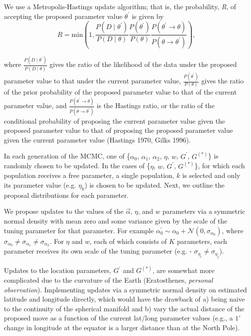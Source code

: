 \documentclass[12pt]{article}
\newcommand{\identifyadmixsource}[1]{{#1^{(*)}}}
\begin{document}
We use a Metropolis-Hastings update algorithm; that is, the probability, \emph{R}, of accepting the proposed parameter value $\theta^{\prime}$ is given by 
\begin{equation}
R = \text{min}\left(1, \frac{P(D \mid \theta^{\prime})} {P(D \mid \theta)} 
				\frac{P(\theta^{\prime})}{P(\theta)} 
				\frac{P(\theta^{\prime} \to \theta)}{P(\theta \to \theta^{\prime})}		\right) \text{,}
\label{eq:MH_algorithm}
\end{equation}

where $\frac{P(D \mid \theta^{\prime})} {P(D \mid \theta)}$ gives the ratio of the likelihood of the data under the proposed parameter value to that under the current parameter value, $\frac{P(\theta^{\prime})}{P(\theta)}$ gives the ratio of the prior probability of the proposed parameter value to that of the current parameter value, and $\frac{P(\theta^{\prime} \to \theta)}{P(\theta \to \theta^{\prime})}$ is the Hastings ratio, or the ratio of the conditional probability of proposing the current parameter value given the proposed parameter value to that of proposing the proposed parameter value given the current parameter value (Hastings 1970, Gilks 1996).

In each generation of the MCMC, one of \{$\alpha_0$, $\alpha_1$, $\alpha_2$, $\eta$, $w$, $G^{\prime}$, $\identifyadmixsource{G}$\} is randomly chosen to be updated.  In the cases of \{$\eta$, $w$, $G^{\prime}$, $\identifyadmixsource{G}$\}, for which each population receives a free parameter, a single population, $k$ is selected and only its parameter value (e.g. $\eta_k$) is chosen to be updated.  Next, we outline the proposal distributions for each parameter.

We propose updates to the values of the $\vec{\alpha}$, $\eta$, and $w$ parameters via a symmetric normal density with mean zero and some variance given by the scale of the tuning parameter for that parameter.  For example $\alpha_0^{\prime} \sim \alpha_0 + \mathcal{N}(0,\sigma_{\alpha_0})$, where $\sigma_{\alpha_0} \neq \sigma_{\alpha_1} \neq \sigma_{\alpha_2}$.  For $\eta$ and $w$, each of which consists of $K$ parameters, each parameter receives its own scale of the tuning parameter (e.g. - $\sigma_{\eta_{i}} \neq \sigma_{\eta_{j}}$).  

Updates to the location parameters, $G^{\prime}$ and $\identifyadmixsource{G}$, are somewhat more complicated due to the curvature of the Earth (Eratosthenes, \textit{personal observation}).  Implementing updates via a symmetric normal density on estimated latitude and longitude directly, which would have the drawback of a) being naive to the continuity of the spherical manifold and b) vary the actual distance of the proposed move as a function of the current lat/long parameter values (e.g., a $1^{\circ}$ change in longitude at the equator is a larger distance than at the North Pole).  
\end{document}
